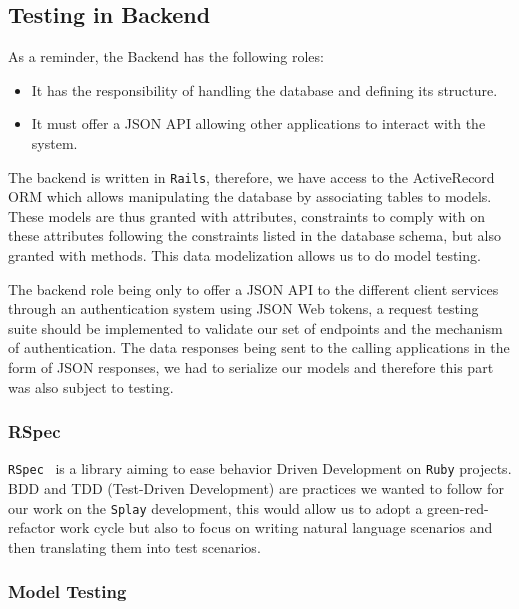 \documentclass{eplmastersthesis}
\begin{document}
      \subsection{Testing in Backend}

        As a reminder, the Backend has the following
        roles:

        \begin{itemize}
          \item It has the responsibility of handling the database and
          defining its structure.
          \item It must offer a JSON API allowing other applications to interact
          with the system.
        \end{itemize}

        The backend is written in \texttt{Rails}, therefore, we have access to the
        ActiveRecord ORM which allows manipulating the database by associating
        tables to models. These models are thus granted with attributes,
        constraints to comply with on these attributes following the constraints
        listed in the database schema, but also granted with methods. This data
        modelization allows us to do model testing.

        The backend role being only to offer a JSON API to the different client
        services through an authentication system using JSON Web tokens, a
        request testing suite should be implemented to validate our set of
        endpoints and the mechanism of authentication.
        The data responses being sent to the calling applications in the form
        of JSON responses, we had to serialize our models and therefore this
        part was also subject to testing.

        \subsubsection{RSpec}

          \texttt{RSpec}~\cite{rspec} is a library aiming to ease behavior Driven
          Development on \texttt{Ruby} projects. BDD and TDD (Test-Driven Development) are
          practices we wanted to follow for our work on the \texttt{Splay} development,
          this would allow us to adopt a green-red-refactor work cycle but also
          to focus on writing natural language scenarios and then translating
          them into test scenarios.

        \subsubsection{Model Testing}
\end{document}
